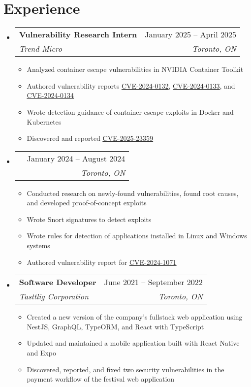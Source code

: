 \documentclass[letterpaper,11pt]{article}
\makeatletter
\newcommand{\resumeItem}[1]{
  \item\small{
    {#1 \vspace{-2pt}}
  }
}
\newcommand{\resumeSubheading}[4]{
  \vspace{-2pt}\item
    \begin{tabular*}{0.97\textwidth}[t]{l@{\extracolsep{\fill}}r}
      \textbf{#1} & #2 \\
      \textit{\small#3} & \textit{\small #4} \\
    \end{tabular*}\vspace{-7pt}
}
\newcommand{\resumeSubSubheading}[2]{
    \item
    \begin{tabular*}{0.97\textwidth}{l@{\extracolsep{\fill}}r}
      \textit{\small#1} & \textit{\small #2} \\
    \end{tabular*}\vspace{-7pt}
}
\newcommand{\resumeSubHeadingListStart}{\begin{itemize}[leftmargin=0.15in, label={}]}
\newcommand{\resumeSubHeadingListEnd}{\end{itemize}}
\newcommand{\resumeItemListStart}{\begin{itemize}}
\newcommand{\resumeItemListEnd}{\end{itemize}\vspace{-5pt}}
\newcommand{\Link}[2]{\href{#2}{\underline{#1}}}
\newcommand{\CVE}[1]{\Link{CVE-#1}{https://www.cve.org/CVERecord?id=CVE-#1}} %
\makeatother
\begin{document}
\section{Experience}
  \resumeSubHeadingListStart
    \resumeSubheading
      {Vulnerability Research Intern}{January 2025 -- April 2025}
      {Trend Micro}{Toronto, ON}
      \resumeItemListStart
        \resumeItem{Analyzed container escape vulnerabilities in NVIDIA Container Toolkit}
        \resumeItem{Authored vulnerability reports \CVE{2024-0132}, \CVE{2024-0133}, and \CVE{2024-0134}}
        \resumeItem{Wrote detection guidance of container escape exploits in Docker and Kubernetes}
        \resumeItem{Discovered and reported \CVE{2025-23359}}
      \resumeItemListEnd

    \resumeSubheading
      {}{January 2024 -- August 2024}
      {}{Toronto, ON}
      \resumeItemListStart
        \resumeItem{Conducted research on newly-found vulnerabilities, found root causes, and developed proof-of-concept exploits}
        \resumeItem{Wrote Snort signatures to detect exploits}
        \resumeItem{Wrote rules for detection of applications installed in Linux and Windows systems}
        \resumeItem{Authored vulnerability report for \Link{CVE-2024-1071}{https://www.cve.org/CVERecord?id=CVE-2024-1071}}
      \resumeItemListEnd

    \resumeSubheading
      {Software Developer}{June 2021 -- September 2022}
      {Tasttlig Corporation}{Toronto, ON}
      \resumeItemListStart
        \resumeItem{Created a new version of the company's fullstack web application
        using NestJS, GraphQL, TypeORM, and React with TypeScript}
        \resumeItem{Updated and maintained a mobile application built with React Native and Expo}
        \resumeItem{Discovered, reported, and fixed two security vulnerabilities
        in the payment workflow of the festival web application}
      \resumeItemListEnd
      
  \resumeSubHeadingListEnd
\end{document}

